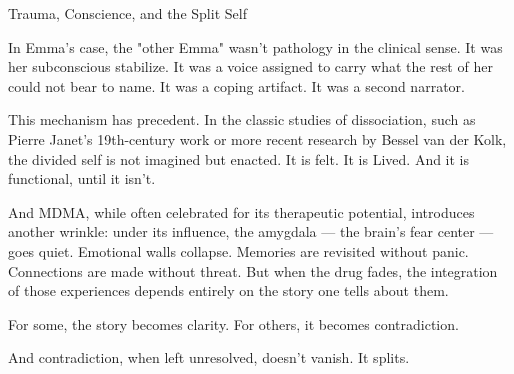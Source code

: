 \begin{PsychologicalSidebar}{Trauma, Conscience, and the Split Self}
\medskip


In Emma’s case, the "other Emma" wasn’t pathology in the clinical sense. It was her subconscious 
stabilize. It was a voice assigned to carry what the rest of her could not bear to name. It was a coping 
artifact. It was a second narrator.

\medskip


This mechanism has precedent. In the classic studies of dissociation, such as Pierre Janet’s 19th-century 
work or more recent research by Bessel van der Kolk, the divided self is not imagined but enacted. It 
is felt. It is Lived. And it is functional, until it isn’t.

\medskip


And MDMA, while often celebrated for its therapeutic potential, introduces another wrinkle: under 
its influence, the amygdala --- the brain’s fear center --- goes quiet. Emotional walls collapse. 
Memories are revisited without panic. Connections are made without threat. But when the drug fades, 
the integration of those experiences depends entirely on the story one tells about them.

\medskip


For some, the story becomes clarity. For others, it becomes contradiction.

\medskip


And contradiction, when left unresolved, doesn’t vanish. It splits.

\end{PsychologicalSidebar}

\medskip


